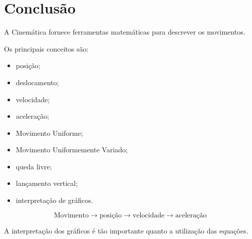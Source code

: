 \documentclass[a4paper,12pt]{article}
\begin{document}
\begin{center}

\end{center}


\section*{Conclusão}

A Cinemática fornece ferramentas matemáticas para descrever os
movimentos.

Os principais conceitos são:

\begin{itemize}

    \item posição;

    \item deslocamento;

    \item velocidade;

    \item aceleração;

    \item Movimento Uniforme;

    \item Movimento Uniformemente Variado;

    \item queda livre;

    \item lançamento vertical;

    \item interpretação de gráficos.

\end{itemize}

\begin{resumo}

\[
\boxed{
\text{Movimento}
\rightarrow
\text{posição}
\rightarrow
\text{velocidade}
\rightarrow
\text{aceleração}
}
\]

A interpretação dos gráficos é tão importante quanto a utilização
das equações.

\end{resumo}

\end{document}
